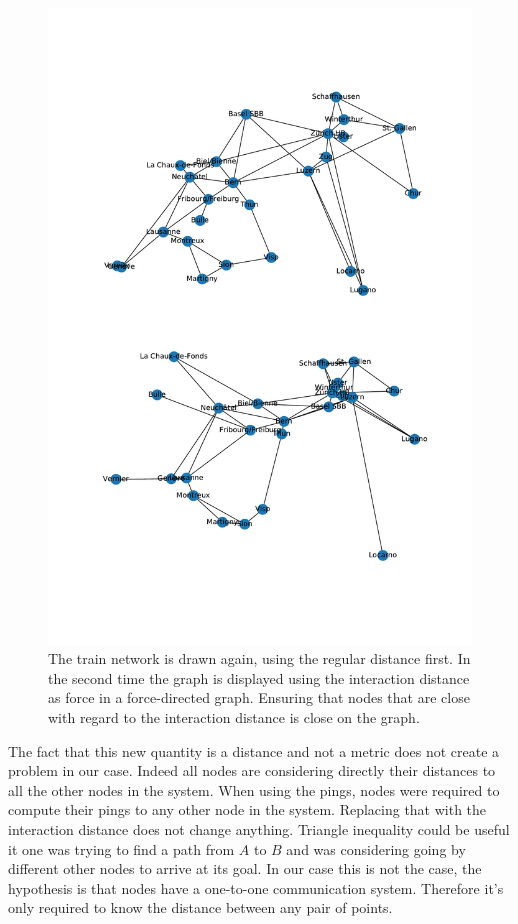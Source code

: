 \documentclass[a4paper,11pt,oneside]{report}
\begin{document}
\begin{figure}[!h] 
\centering
\includegraphics[width=350pt]{figures/CFF-NewDistances}
\caption{The train network is drawn again, using the regular distance first. In
  the second time the graph is displayed using the interaction distance as
  force in a force-directed graph. Ensuring that nodes that are close with
  regard to the interaction distance is close on the graph.}
  \label{fig:CFF-NewDistances}
\end{figure}

The fact that this new quantity is a distance and not a metric does not create
a problem in our case. Indeed all nodes are considering directly their distances
to all the other nodes in the system. When using the pings, nodes were required
to compute their pings to any other node in the system. Replacing that with the
interaction distance does not change anything. Triangle inequality could be
useful it one was trying to find a path from $A$ to $B$ and was considering going by different other nodes to arrive at its goal. In our case this is not
the case, the hypothesis is that nodes have a one-to-one communication system.
Therefore it's only required to know the distance between any pair of points.
\end{document}
